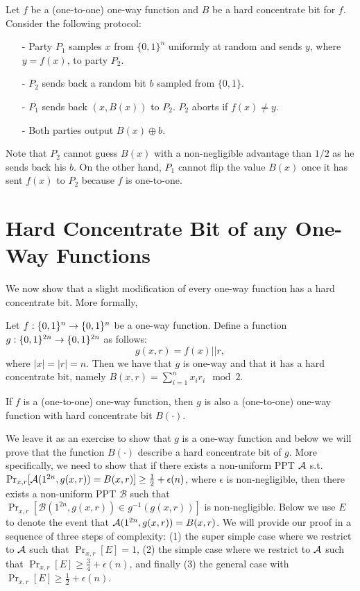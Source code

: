 Let $f$ be a (one-to-one) one-way function and $B$ be a hard concentrate bit for $f$. Consider the following protocol:
\begin{itemize}
\item[-] Party $P_1$ samples $x$ from $\{0,1\}^n$ uniformly at random and sends $y$, where $y = f(x)$, to party $P_2$.
\item[-] $P_2$ sends back a random bit $b$ sampled from $\{0,1\}$.
\item[-] $P_1$ sends back $(x, B(x))$ to $P_2$. $P_2$ aborts if $f(x) \neq y$.
\item[-]  Both parties output $B(x)\oplus b$.
\end{itemize}
Note that $P_2$ cannot guess $B(x)$ with a non-negligible advantage than $1/2$ as he sends back his $b$.
On the other hand, $P_1$ cannot flip the value $B(x)$ once it has sent $f(x)$ to $P_2$ because $f$ is one-to-one.


\section{Hard Concentrate Bit of any One-Way Functions}
We now show that a slight modification of every one-way function has a hard concentrate bit. More formally,
\begin{theorem}\label{thm:hard-concentrate-bit}
Let  $f:\{0,1\}^{n} \rightarrow \{0,1\}^{n}$ be a one-way function.
Define a function $g:\{0,1\}^{2n} \rightarrow \{0,1\}^{2n}$ as follows:
$$g(x,r) = f(x) || r,$$
where $|x| = |r| =n$. Then we have that $g$ is one-way and that it has a hard concentrate bit, namely $B(x, r) = \sum_{i=1}^n x_i r_i\mod 2$.
\end{theorem}
\begin{remark}
If $f$ is a (one-to-one) one-way function, then $g$ is also a (one-to-one) one-way function with hard concentrate bit $B(\cdot)$.
\end{remark}
\proof
We leave it as an exercise to show that $g$ is a one-way function and below we will prove that the function $B(\cdot)$ describe a hard concentrate bit of $g$. More specifically, we need to show that if there exists a non-uniform PPT  $\mathcal{A}$ s.t. $\Pr_{x,r}[\mathcal{A}(1^{2n},g(x,r)) = B(x,r)] \ge \frac{1}{2} + \epsilon(n)$, where $\epsilon$ is non-negligible, then there exists a non-uniform PPT $\mathcal{B}$ such that $\Pr_{x,r}[\mathcal{B}(1^{2n}, g(x,r)) \in g^{-1}(g(x,r))]$ is non-negligible. Below we use $E$ to denote the event that $\mathcal{A}(1^{2n},g(x,r)) = B(x,r)$. We will provide our proof in a sequence of three steps of complexity: (1) the super simple case where we restrict to $\mathcal{A}$ such that $\Pr_{x,r}[E] = 1$, (2) the simple case where we restrict to $\mathcal{A}$ such that $\Pr_{x,r}[E] \geq \frac34 + \epsilon(n)$, and finally (3) the general case with $\Pr_{x,r}[E] \geq \frac12 + \epsilon(n)$.


